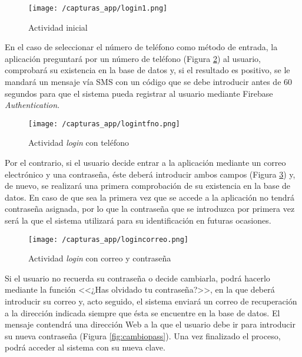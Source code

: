 \begin{figure}[!h]
	\begin{center}
		\texttt{[image: /capturas\_app/login1.png]}
		\caption{Actividad inicial}
		\label{fig:login1}
	\end{center}
\end{figure}

\newpage

En el caso de seleccionar el número de teléfono como método de entrada, la aplicación preguntará por un número de teléfono (Figura \ref{fig:logintfno}) al usuario, comprobará su existencia en la base de datos y, si el resultado es positivo, se le mandará un mensaje vía SMS con un código que se debe introducir antes de 60 segundos para que el sistema pueda registrar al usuario mediante Firebase \textit{Authentication}.

\begin{figure}[!h]
	\begin{center}
		\texttt{[image: /capturas\_app/logintfno.png]}
		\caption{Actividad \textit{login} con teléfono}
		\label{fig:logintfno}
	\end{center}
\end{figure}

Por el contrario, si el usuario decide entrar a la aplicación mediante un correo electrónico y una contraseña, éste deberá introducir ambos campos (Figura \ref{fig:logincorreo}) y, de nuevo, se realizará una primera comprobación de su existencia en la base de datos. En caso de que sea la primera vez que se accede a la aplicación no tendrá contraseña asignada, por lo que la contraseña que se introduzca por primera vez será la que el sistema utilizará para su identificación en futuras ocasiones.

\begin{figure}[!h]
	\begin{center}
		\texttt{[image: /capturas\_app/logincorreo.png]}
		\caption{Actividad \textit{login} con correo y contraseña}
		\label{fig:logincorreo}
	\end{center}
\end{figure}

\newpage

Si el usuario no recuerda su contraseña o decide cambiarla, podrá hacerlo mediante la función <<¿Has olvidado tu contraseña?>>, en la que deberá introducir su correo y, acto seguido, el sistema enviará un correo de recuperación a la dirección indicada siempre que ésta se encuentre en la base de datos. El mensaje contendrá una dirección Web a la que el usuario debe ir para introducir su nueva contraseña (Figura \ref{fig:cambiopass}). Una vez finalizado el proceso, podrá acceder al sistema con su nueva clave.

